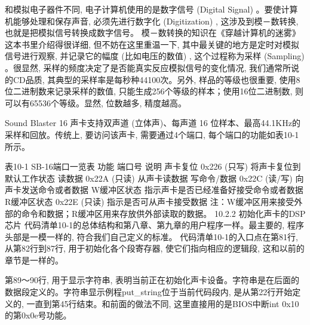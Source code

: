 \documentclass[12pt]{article}
\begin{document}
\begin{CJK}{UTF8}{gbsn}
和模拟电子器件不同, 电子计算机使用的是数字信号 (Digital Signal) 。要使计算机能够处理和保存声音, 必须先进行数字化 (Digitization) , 这涉及到模－数转换, 也就是把模拟信号转换成数字信号。
模－数转换的知识在《穿越计算机的迷雾》这本书里介绍得很详细, 但不妨在这里重温一下, 其中最关键的地方是定时对模拟信号进行观察, 并记录它的幅度 (比如电压的数值) , 这个过程称为采样 (Sampling) 。很显然, 采样的频度决定了是否能真实反应模拟信号的变化情况, 我们通常所说的CD品质, 其典型的采样率是每秒种44100次。另外, 样品的等级也很重要, 使用8位二进制数来记录采样的数值, 只能生成256个等级的样本；使用16位二进制数, 则可以有65536个等级。显然, 位数越多, 精度越高。

Sound Blaster 16 声卡支持双声道 (立体声)、每声道 16 位样本、最高44.1KHz的采样和回放。传统上, 要访问该声卡, 需要通过4个端口, 每个端口的功能如表10-1所示。

表10-1 SB-16端口一览表
功能	端口号	说明
声卡复位	0x226 (只写) 	将声卡复位到默认工作状态
读数据	0x22A (只读) 	从声卡读数据
写命令/数据	0x22C (读/写) 	向声卡发送命令或者数据
W缓冲区状态		指示声卡是否已经准备好接受命令或者数据
R缓冲区状态	0x22E (只读) 	指示是否可从声卡接受数据
注：W缓冲区用来接受外部的命令和数据；R缓冲区用来存放供外部读取的数据。
10.2.2  初始化声卡的DSP芯片
代码清单10-1的总体结构和第八章、第九章的用户程序一样。最主要的, 程序头部是一模一样的, 符合我们自己定义的标准。
代码清单10-1的入口点在第81行, 从第82行到87行, 用于初始化各个段寄存器, 使它们指向相应的逻辑段, 这和以前的章节是一样的。

第89～90行, 用于显示字符串, 表明当前正在初始化声卡设备。字符串是在后面的数据段定义的。字符串显示例程put\_{}string位于当前代码段内, 是从第22行开始定义的, 一直到第45行结束。和前面的做法不同, 这里直接用的是BIOS中断int 0x10的第0x0e号功能。


\end{CJK}
\end{document}
